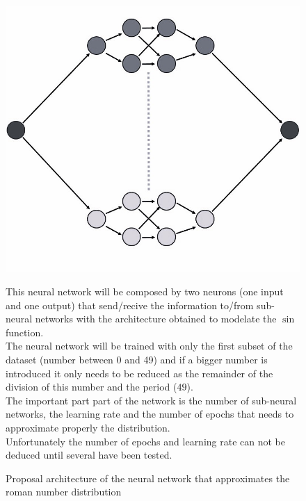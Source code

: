 \documentclass[a4paper, 11pt]{article}
\begin{document}
\begin{figure}[h]
    \begin{minipage}{5.5cm}
        \begin{center}
            \includegraphics[width = 1\linewidth]{Neural_Network/roman_architecture.jpg}
            \caption{Proposal architecture of the neural network that approximates the roman number distribution}
            \label{roman-architecture}
        \end{center}
    \end{minipage}
    \hspace{1em}
    \begin{minipage}{9cm}
        This neural network will be composed by two neurons (one input and one output) that send/recive the information to/from sub-neural networks with the architecture obtained to modelate the $\sin$ function.\\
        The neural network will be trained with only the first subset of the dataset (number between 0 and 49) and if a bigger number is introduced it only needs to be reduced as the remainder of the division of this number and the period ($49$).\\
        The important part part of the network is the number of sub-neural networks, the learning rate and the number of epochs that needs to approximate properly the distribution.\\
        Unfortunately the number of epochs and learning rate can not be deduced until several have been tested.
    \end{minipage}
\end{figure}\\
\end{document}
